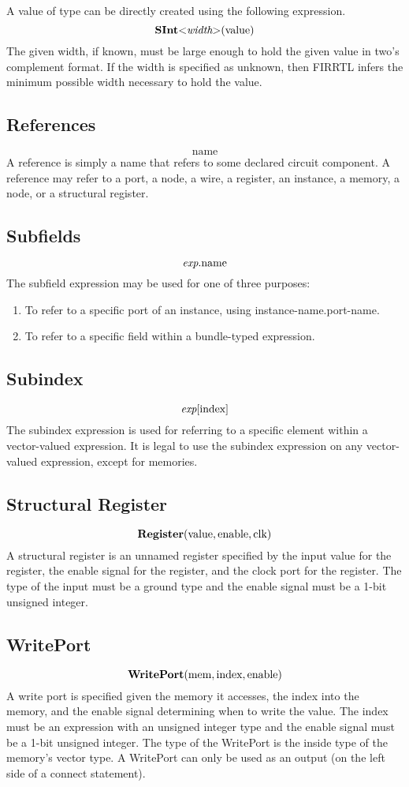 \documentclass[10pt]{article}
\begin{document}
A value of type  can be directly created using the following expression.
\[
\text{\bf SInt}\text{\bf $<$} \text{\em width} \text{\bf $>$}(\text{value})
\]
The given width, if known, must be large enough to hold the given value in two's complement format.
If the width is specified as unknown, then FIRRTL infers the minimum possible width necessary to hold the value.

\subsection{References}
\[
\text{name}
\]
A reference is simply a name that refers to some declared circuit component.
A reference may refer to a port, a node, a wire, a register, an instance, a memory, a node, or a structural register.

\subsection{Subfields}
\[
\text{\em exp}.\text{name}
\]
The subfield expression may be used for one of three purposes:
\begin{enumerate}
\item To refer to a specific port of an instance, using instance-name.port-name. 
\item To refer to a specific field within a bundle-typed expression.
\end{enumerate}

\subsection{Subindex}
\[
\text{\em exp}[\text{index}]
\]
The subindex expression is used for referring to a specific element within a vector-valued expression.
It is legal to use the subindex expression on any vector-valued expression, except for memories. 

\subsection{Structural Register}
\[
\text{\bf Register}(\text{value}, \text{enable}, \text{clk})
\]
A structural register is an unnamed register specified by the input value for the register, the enable signal for the register, and the clock port for the register.
The type of the input must be a ground type and the enable signal must be a 1-bit unsigned integer. 

\subsection{WritePort}
\[
\text{\bf WritePort}(\text{mem},\text{index},\text{enable})
\]
A write port is specified given the memory it accesses, the index into the memory, and the enable signal determining when to write the value.
The index must be an expression with an unsigned integer type and the enable signal must be a 1-bit unsigned integer. 
The type of the WritePort is the inside type of the memory's vector type.
A WritePort can only be used as an output (on the left side of a connect statement).
\end{document}
